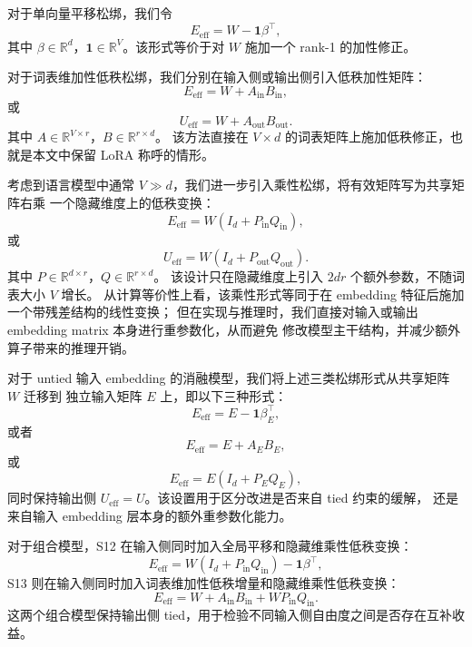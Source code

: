 对于单向量平移松绑，我们令
\begin{equation}
    E_{\mathrm{eff}} = W-\mathbf{1}\beta^\top,
\end{equation}
其中 $\beta\in\mathbb{R}^{d}$，$\mathbf{1}\in\mathbb{R}^{V}$。该形式等价于对 $W$
施加一个 rank-1 的加性修正。

对于词表维加性低秩松绑，我们分别在输入侧或输出侧引入低秩加性矩阵：
\begin{equation}
    E_{\mathrm{eff}} = W+A_{\mathrm{in}}B_{\mathrm{in}},
\end{equation}
或
\begin{equation}
    U_{\mathrm{eff}} = W+A_{\mathrm{out}}B_{\mathrm{out}}.
\end{equation}
其中 $A\in\mathbb{R}^{V\times r}$，$B\in\mathbb{R}^{r\times d}$。
该方法直接在 $V\times d$ 的词表矩阵上施加低秩修正，也就是本文中保留 LoRA 称呼的情形。

考虑到语言模型中通常 $V\gg d$，我们进一步引入乘性松绑，将有效矩阵写为共享矩阵右乘
一个隐藏维度上的低秩变换：
\begin{equation}
    E_{\mathrm{eff}} = W(I_d+P_{\mathrm{in}}Q_{\mathrm{in}}),
\end{equation}
或
\begin{equation}
    U_{\mathrm{eff}} = W(I_d+P_{\mathrm{out}}Q_{\mathrm{out}}).
\end{equation}
其中 $P\in\mathbb{R}^{d\times r}$，$Q\in\mathbb{R}^{r\times d}$。
该设计只在隐藏维度上引入 $2dr$ 个额外参数，不随词表大小 $V$ 增长。
从计算等价性上看，该乘性形式等同于在 embedding 特征后施加一个带残差结构的线性变换；
但在实现与推理时，我们直接对输入或输出 embedding matrix 本身进行重参数化，从而避免
修改模型主干结构，并减少额外算子带来的推理开销。

对于 untied 输入 embedding 的消融模型，我们将上述三类松绑形式从共享矩阵 $W$ 迁移到
独立输入矩阵 $E$ 上，即以下三种形式：
\begin{equation}
    E_{\mathrm{eff}} = E-\mathbf{1}\beta_E^\top,
\end{equation}
或者
\begin{equation}
    E_{\mathrm{eff}} = E+A_EB_E,
\end{equation}
或
\begin{equation}
    E_{\mathrm{eff}} = E(I_d+P_EQ_E),
\end{equation}
同时保持输出侧 $U_{\mathrm{eff}}=U$。该设置用于区分改进是否来自 tied 约束的缓解，
还是来自输入 embedding 层本身的额外重参数化能力。

对于组合模型，S12 在输入侧同时加入全局平移和隐藏维乘性低秩变换：
\begin{equation}
    E_{\mathrm{eff}} =
    W(I_d+P_{\mathrm{in}}Q_{\mathrm{in}})-\mathbf{1}\beta^\top,
\end{equation}
S13 则在输入侧同时加入词表维加性低秩增量和隐藏维乘性低秩变换：
\begin{equation}
    E_{\mathrm{eff}} =
    W+A_{\mathrm{in}}B_{\mathrm{in}}+WP_{\mathrm{in}}Q_{\mathrm{in}}.
\end{equation}
这两个组合模型保持输出侧 tied，用于检验不同输入侧自由度之间是否存在互补收益。
